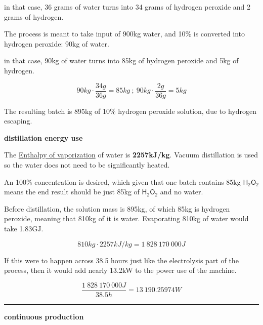 \documentclass[a4paper]{article}
\begin{document}
	in that case, 36 grams of water turns into 34 grams of hydrogen peroxide and 2 grams of hydrogen.
	
	\medskip
	
	The process is meant to take input of 900kg water, and 10\% is converted into hydrogen peroxide: 90kg of water.
	
	\medskip
	
	in that case, 90kg of water turns into 85kg of hydrogen peroxide and 5kg of hydrogen.
	
	$$ 90kg \cdot \frac{34g}{36g} = 85kg \ ;\ 90kg \cdot \frac{2g}{36g} = 5kg $$
	
	The resulting batch is 895kg of 10\% hydrogen peroxide solution, due to hydrogen escaping.
	
	\pagebreak
	
	\begin{center}
		\textbf{distillation energy use}
	\end{center}
	
	The \href{https://en.wikipedia.org/wiki/Enthalpy_of_vaporization}{Enthalpy of vaporization} of water is \textbf{2257kJ/kg}. Vacuum distillation is used so the water does not need to be significantly heated.
	
	\medskip
	
	An 100\% concentration is desired, which given that one batch contains 85kg $\mathsf{H_2O_2}$ means the end result should be just 85kg of $\mathsf{H_2O_2}$ and no water.
	
	
	\medskip
	
	Before distillation, the solution mass is 895kg, of which 85kg is hydrogen peroxide, meaning that 810kg of it is water. %
	Evaporating 810kg of water would take 1.83GJ.
	
	$$ 810kg \cdot 2257kJ/kg = 1\ 828\ 170\ 000 J$$
	
	If this were to happen across 38.5 hours just like the electrolysis part of the process, then it would add nearly 13.2kW to the power use of the machine.
	
	$$ \frac{1\ 828\ 170\ 000 J}{38.5h} = 13\ 190.25974 W $$
	
	\medskip
	
	\noindent\hrule
	
	\begin{center}
		\textbf{continuous production}
	\end{center}
	
\end{document}
